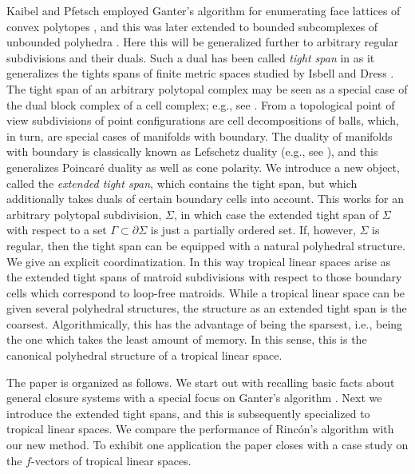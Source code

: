 \documentclass[11pt,a4paper]{amsart}
\theoremstyle{definition}
\theoremstyle{plain}
\begin{document}
Kaibel and Pfetsch employed Ganter's algorithm for enumerating face lattices of convex polytopes \cite{KaibelPfetsch:2002}, and this was later extended to bounded subcomplexes of unbounded polyhedra \cite{HerrmannJoswigPfetsch:2013}.
Here this will be generalized further to arbitrary regular subdivisions and their duals.
Such a dual has been called \emph{tight span} in \cite{HerrmannJoswigSpeyer:2012} as it generalizes the tights spans of finite metric spaces studied by Isbell \cite{Isbell:1964} and Dress \cite{Dress:1984}.
The tight span of an arbitrary polytopal complex may be seen as a special case of the dual block complex of a cell complex; e.g., see \cite[\S64]{Munkres:1984}.
From a topological point of view subdivisions of point configurations are cell decompositions of balls, which, in turn, are special cases of manifolds with boundary.
The duality of manifolds with boundary is classically known as Lefschetz duality (e.g., see \cite[\S70]{Munkres:1984}), and this generalizes Poincar\'e duality as well as cone polarity.
We introduce a new object, called the \emph{extended tight span}, which contains the tight span, but which additionally takes duals of certain boundary cells into account.
This works for an arbitrary polytopal subdivision, $\Sigma$, in which case the extended tight span of $\Sigma$ with respect to a set $\Gamma\subset\partial\Sigma$ is just a partially ordered set.
If, however, $\Sigma$ is regular, then the tight span can be equipped with a natural polyhedral structure.
We give an explicit coordinatization.
In this way tropical linear spaces arise as the extended tight spans of matroid subdivisions with respect to those boundary cells which correspond to loop-free matroids.
While a tropical linear space can be given several polyhedral structures, the structure as an extended tight span is the coarsest.
Algorithmically, this has the advantage of being the sparsest, i.e., being the one which takes the least amount of memory.
In this sense, this is the canonical polyhedral structure of a tropical linear space.

The paper is organized as follows.
We start out with recalling basic facts about general closure systems with a special focus on Ganter's algorithm \cite{Ganter:1984}.
Next we introduce the extended tight spans, and this is subsequently specialized to tropical linear spaces.
We compare the performance of Rinc\'on's algorithm \cite{Rincon:2013} with our new method.
To exhibit one application the paper closes with a case study on the $f$-vectors of tropical linear spaces.
\end{document}
